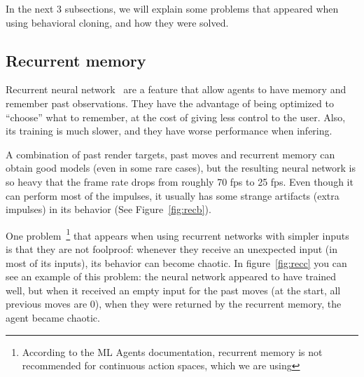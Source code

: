 In the next 3 subsections, we will explain some problems that appeared when using behavioral cloning, and how they were solved.

\subsection{Recurrent memory} %

Recurrent neural network~\cite{zaremba2014recurrent} are a feature that allow agents to have memory and remember past observations. They have the advantage of being optimized to ``choose'' what to remember, at the cost of giving less control to the user. Also, its training is much slower, and they have worse performance when infering.

A combination of past render targets, past moves and recurrent memory can obtain good models (even in some rare cases), but the resulting neural network is so heavy that the frame rate drops from roughly 70 fps to 25 fps. Even though it can perform most of the impulses, it usually has some strange artifacts (extra impulses) in its behavior (See Figure~\ref{fig:recb}).

One problem~\footnote{According to the ML Agents documentation, recurrent memory is not recommended for continuous action spaces, which we are using} that appears when using recurrent networks with simpler inputs is that they are not foolproof: whenever they receive an unexpected input (in most of its inputs), its behavior can become chaotic. In figure~\ref{fig:recc} you can see an example of this problem: the neural network appeared to have trained well, but when it received an empty input for the past moves (at the start, all previous moves are 0), when they were returned by the recurrent memory, the agent became chaotic.

